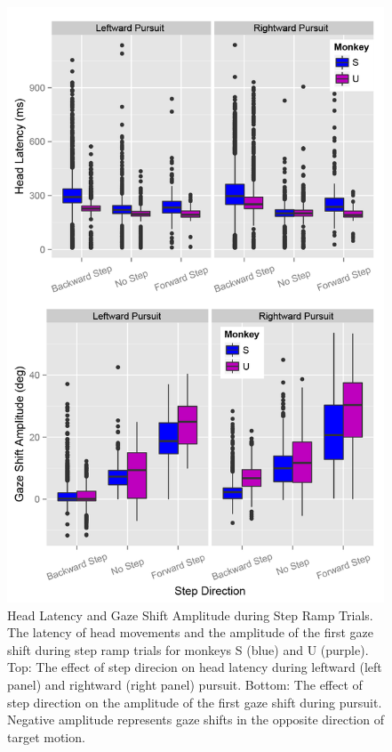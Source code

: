 \documentclass[12pt]{article}
\begin{document}
\begin{figure}
\centering
\includegraphics[width=0.7\linewidth]{./figs/StepRampLatencyandGSAmp}
\caption[Head Latency and Gaze Shift Amplitude during Step Ramp Trials]{Head Latency and Gaze Shift Amplitude during Step Ramp Trials. The latency of head movements and the amplitude of the first gaze shift during step ramp trials for monkeys S (blue) and U (purple). Top: The effect of step direcion on head latency during leftward (left panel) and rightward (right panel) pursuit. Bottom: The effect of step direction on the amplitude of the first gaze shift during pursuit. Negative amplitude represents gaze shifts in the opposite direction of target motion.}
\label{fig:StepRampLatencyandGSAmp}
\end{figure}
\end{document}
